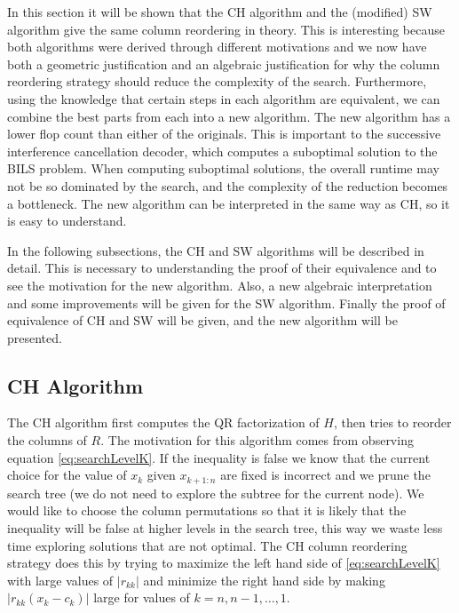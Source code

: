 \documentclass[12pt,Bold,letterpaper]{mcgilletdclass}
\newcommand{\vsp}{\vspace{\baselineskip}}
\begin{document}
In this section it will be shown that the CH algorithm and the  (modified)  SW algorithm give the same
column reordering in theory. This is interesting because both algorithms were derived through different motivations
and we now have both a geometric justification and an algebraic justification 
for why the column reordering strategy should reduce the complexity of the search.
Furthermore, using the knowledge that certain steps in each algorithm are equivalent,
we can combine the best parts from each into a new algorithm. The new algorithm
has a lower flop count than either of the originals.
This is important to the successive interference cancellation decoder, 
which computes a suboptimal solution to the BILS problem. When computing suboptimal solutions, the overall runtime may not be so dominated by the search, and the complexity of the reduction becomes a bottleneck.
The new algorithm can be interpreted in the same way as CH,
so it is easy to understand. 

In the following subsections, the CH and SW algorithms will be described in detail. This is necessary to understanding the proof of their equivalence and to see the motivation for the new algorithm. Also, a new algebraic interpretation and some improvements will be given for the SW algorithm. Finally the proof of equivalence of CH and SW will be given, and the new algorithm will be presented.

\vsp \subsection{CH Algorithm} \label{subsec:CH}
The CH algorithm first computes the QR factorization of $H$,
then  tries to reorder the columns of $R$.
The motivation for this algorithm comes from observing equation \eqref{eq:searchLevelK}.
If the inequality is false we know that the current choice for the value of
$x_k$ given $x_{k+1:n}$ are fixed is incorrect and we prune the search tree (we do not need to explore the subtree for the current node). We
would like to choose the column permutations so that it is likely that the
inequality will be false at higher levels in the search tree, this way we waste less time exploring solutions that are not optimal. The CH column reordering strategy
does this by trying to maximize the left hand side of  \eqref{eq:searchLevelK} with large values of $\left | r_{kk}
\right |$ and minimize the right hand side by making $\left | r_{kk}(x_k-c_k) \right |$
large for values of $k = n,n-1, \dots, 1$.
\end{document}

